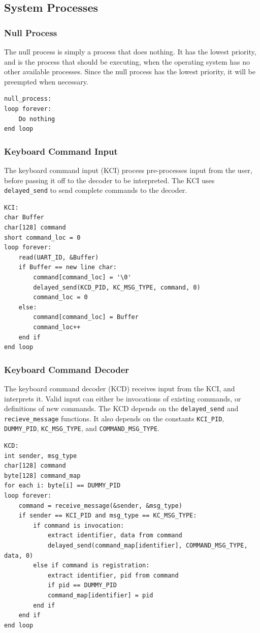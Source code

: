 \documentclass[titlepage]{article}
\begin{document}
\subsection{System Processes}
\subsubsection{Null Process}
The null process is simply a process that does nothing.  It has the lowest
priority, and is the process that should be executing, when the operating system
has no other available processes.  Since the null process has the lowest
priority, it will be preempted when necessary.

\begin{verbatim}
null_process:
loop forever:
    Do nothing
end loop
\end{verbatim}

\subsubsection{Keyboard Command Input}
The keyboard command input (KCI) process pre-processes input from the user,
before passing it off to the decoder to be interpreted.  The KCI uses
\verb!delayed_send! to send complete commands to the decoder.

\begin{verbatim}
KCI:
char Buffer
char[128] command
short command_loc = 0
loop forever:
    read(UART_ID, &Buffer)
    if Buffer == new line char:
        command[command_loc] = '\0'
        delayed_send(KCD_PID, KC_MSG_TYPE, command, 0)
        command_loc = 0
    else:
        command[command_loc] = Buffer
        command_loc++
    end if
end loop
\end{verbatim}

\subsubsection{Keyboard Command Decoder}
The keyboard command decoder (KCD) receives input from the KCI, and interprets
it.  Valid input can either be invocations of existing commands, or definitions
of new commands.  The KCD depends on the \verb!delayed_send! and
\verb!recieve_message! functions.  It also depends on the constants
\verb!KCI_PID!, \verb!DUMMY_PID!, \verb!KC_MSG_TYPE!, and
\verb!COMMAND_MSG_TYPE!.

\begin{verbatim}
KCD:
int sender, msg_type
char[128] command
byte[128] command_map
for each i: byte[i] == DUMMY_PID
loop forever:
    command = receive_message(&sender, &msg_type)
    if sender == KCI_PID and msg_type == KC_MSG_TYPE:
        if command is invocation:
            extract identifier, data from command
            delayed_send(command_map[identifier], COMMAND_MSG_TYPE, data, 0)
        else if command is registration:
            extract identifier, pid from command
            if pid == DUMMY_PID
            command_map[identifier] = pid
        end if
    end if
end loop
\end{verbatim}
\end{document}
